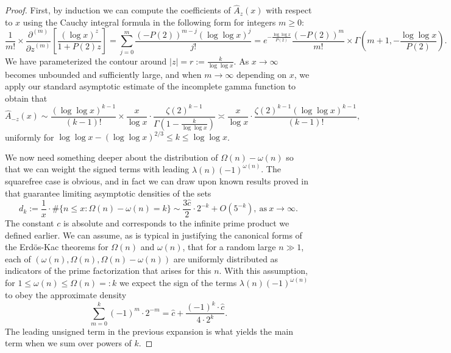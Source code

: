 \documentclass[11pt,reqno,a4letter]{article}
\numberwithin{figure}{section}
\numberwithin{table}{section}
\theoremstyle{plain}
\numberwithin{theorem}{section}
\theoremstyle{definition}
\begin{document}
\begin{proof} 
First, by induction we can compute the coefficients of $\widehat{A}_z(x)$ with respect to 
$x$ using the Cauchy integral formula in the following form for integers $m \geq 0$: 
\[
\frac{1}{m!} \times \frac{\partial^{(m)}}{{\partial z}^{(m)}}\left[ 
     \frac{(\log x)^{z}}{1 + P(2) z}\right] = 
     \sum_{j=0}^{m} \frac{(-P(2))^{m-j} (\log\log x)^{j}}{j!} = 
     e^{-\frac{\log\log x}{P(2)}} \frac{(-P(2))^{m}}{m!} \times 
     \Gamma\left(m+1, -\frac{\log\log x}{P(2)}\right). 
\] 
We have parameterized the contour around $|z| = r := \frac{k}{\log\log x}$. 
As $x \rightarrow \infty$ becomes unbounded and sufficiently large, and when 
$m \rightarrow \infty$ depending on $x$, we apply our standard 
asymptotic estimate of the incomplete gamma function to obtain that 
\[
\widehat{A}_{-z}(x) \sim \frac{(\log\log x)^{k-1}}{(k-1)!} \times \frac{x}{\log x} \cdot 
     \frac{\zeta(2)^{k-1}}{\Gamma\left(1 - \frac{k}{\log\log x}\right)} 
     \asymp 
     \frac{x}{\log x} \cdot \frac{\zeta(2)^{k-1} (\log\log x)^{k-1}}{(k-1)!}, 
\] 
uniformly for $\log\log x - (\log\log x)^{2/3} \leq k \leq \log\log x$. 

We now need something deeper 
about the distribution of $\Omega(n) - \omega(n)$ so that we can weight the signed terms 
with leading $\lambda(n) (-1)^{\omega(n)}$. The squarefree case is obvious, and in fact we 
can draw upon known results proved in \cite[\S 2.4]{MV} that guarantee limiting 
asymptotic densities of the sets 
\[
d_k := \frac{1}{x} \cdot \#\{n \leq x: \Omega(n) - \omega(n) = k\} \sim 
     \frac{3\widehat{c}}{2} \cdot 2^{-k} + O(5^{-k}), \mathrm{\ as\ } x \rightarrow \infty. 
\]
The constant $c$ is absolute and corresponds to the infinite prime product we defined earlier. 
We can assume, as is typical in justifying the canonical forms of the Erd\"os-Kac theorems for 
$\Omega(n)$ and $\omega(n)$, that for a random large $n \gg 1$, each of 
$(\omega(n), \Omega(n), \Omega(n) - \omega(n))$ are uniformly distributed as indicators of the 
prime factorization that arises for this $n$. 
With this assumption, for $1 \leq \omega(n) \leq \Omega(n) =: k$ we expect the sign of the 
terms $\lambda(n) (-1)^{\omega(n)}$ to obey the approximate density 
\[
\sum_{m=0}^{k} (-1)^m \cdot 2^{-m} = \widehat{c} + 
     \frac{(-1)^k \cdot \widehat{c}}{4 \cdot 2^k}. 
\]
The leading unsigned term in the previous expansion is what yields the main term when 
we sum over powers of $k$. 


\end{proof}
\end{document}
